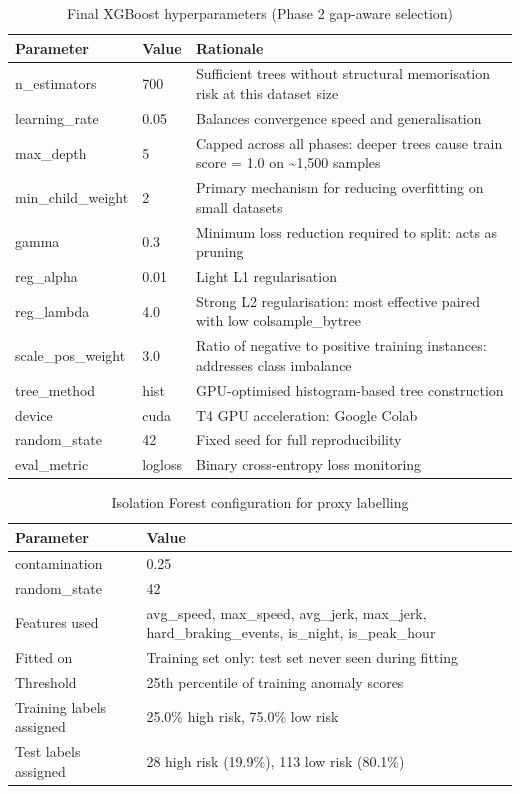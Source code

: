 \documentclass[11pt,a4paper]{article}
\begin{document}
\begin{table}[H]
\centering\small
\caption{Final XGBoost hyperparameters (Phase 2 gap-aware selection)}
\begin{tabularx}{\textwidth}{LLL}
\toprule
\textbf{Parameter} & \textbf{Value} & \textbf{Rationale} \\
\midrule
n\_estimators & 700 & Sufficient trees without structural memorisation risk at this dataset size \\
learning\_rate & 0.05 & Balances convergence speed and generalisation \\
max\_depth & 5 & Capped across all phases: deeper trees cause train score = 1.0 on \textasciitilde{}1,500 samples \\
min\_child\_weight & 2 & Primary mechanism for reducing overfitting on small datasets \\
gamma & 0.3 & Minimum loss reduction required to split: acts as pruning \\
reg\_alpha & 0.01 & Light L1 regularisation \\
reg\_lambda & 4.0 & Strong L2 regularisation: most effective paired with low colsample\_bytree \\
scale\_pos\_weight & 3.0 & Ratio of negative to positive training instances: addresses class imbalance \\
tree\_method & hist & GPU-optimised histogram-based tree construction \\
device & cuda & T4 GPU acceleration: Google Colab \\
random\_state & 42 & Fixed seed for full reproducibility \\
eval\_metric & logloss & Binary cross-entropy loss monitoring \\
\bottomrule
\end{tabularx}
\end{table}

\begin{table}[H]
\centering\small
\caption{Isolation Forest configuration for proxy labelling}
\begin{tabularx}{\textwidth}{LL}
\toprule
\textbf{Parameter} & \textbf{Value} \\
\midrule
contamination & 0.25 \\
random\_state & 42 \\
Features used & avg\_speed, max\_speed, avg\_jerk, max\_jerk, hard\_braking\_events, is\_night, is\_peak\_hour \\
Fitted on & Training set only: test set never seen during fitting \\
Threshold & 25th percentile of training anomaly scores \\
Training labels assigned & 25.0\% high risk, 75.0\% low risk \\
Test labels assigned & 28 high risk (19.9\%), 113 low risk (80.1\%) \\
\bottomrule
\end{tabularx}
\end{table}
\end{document}
